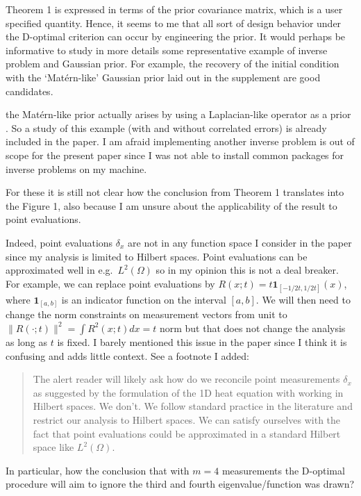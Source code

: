   
\RC Theorem 1 is expressed in terms of the prior covariance matrix,
which is a user specified quantity. Hence, it seems to me that all
sort of design behavior under the D-optimal criterion can occur by
engineering the prior. It would perhaps be informative to study in
more details some representative example of inverse problem and
Gaussian prior. For example, the recovery of the initial condition
with the ‘Mat\'ern-like’ Gaussian prior laid out in the supplement are
good candidates.

\AR the Mat\'ern-like prior actually arises by using a Laplacian-like
operator as a prior \cite{rue2011}. So a study of this example (with
and without correlated errors) is already included in the paper. I am
afraid implementing another inverse problem is out of scope for the
present paper since I was not able to install common packages for
inverse problems \cite{attia2023pyoed, villa18} on my machine.
  
\RC For these it is still not clear how the conclusion from Theorem 1
translates into the Figure 1, also because I am unsure about the
applicability of the result to point evaluations.

\AR Indeed, point evaluations $\delta_x$ are not in any function space
I consider in the paper since my analysis is limited to Hilbert
spaces. Point evaluations can be approximated well in
e.g.~$L^2(\Omega)$ so in my opinion this is not a deal breaker. For
example, we can replace point evaluations by $R(x;t) =
t\mathbf{1}_{[-1/2t, 1/2t]}(x)$, where $\mathbf{1}_{[a,b]}$ is an
indicator function on the interval $[a,b]$. We will then need to
change the norm constraints on measurement vectors from unit to
$\|R(\cdot;t)\|^2 = \int R^2(x;t)dx = t$ norm but that does not change
the analysis as long as $t$ is fixed. I barely mentioned this issue in
the paper since I think it is confusing and adds little context. See a
footnote I added:

\begin{quote} %
  The alert reader will likely ask how do we reconcile point
  measurements $\delta_x$ as suggested by the formulation of the 1D
  heat equation with working in Hilbert spaces. We don't. We follow
  standard practice in the literature and restrict our analysis to
  Hilbert spaces. We can satisfy ourselves with the fact that point
  evaluations could be approximated in a standard Hilbert space like
  $L^2(\Omega)$.
\end{quote}
  
\RC In particular, how the conclusion that with $m = 4$ measurements
the D-optimal procedure will aim to ignore the third and fourth
eigenvalue/function was drawn?

